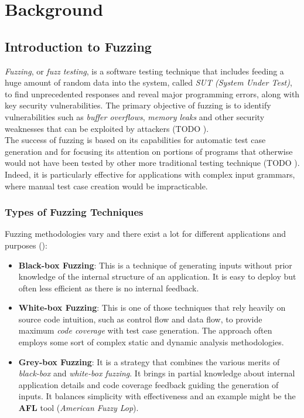 \chapter{Background}

\section{Introduction to Fuzzing}

\textit{Fuzzing}, or \textit{fuzz testing}, is a software testing technique that includes feeding a huge amount of random data into the system, called \textit{SUT (System Under Test)}, to find unprecedented responses and reveal major programming errors, along with key security vulnerabilities. The primary objective of fuzzing is to identify vulnerabilities such as \textit{buffer overflows}, \textit{memory leaks} and other security weaknesses that can be exploited by attackers (TODO \cite{}).
\\The success of fuzzing is based on its capabilities for automatic test case generation and for focusing its attention on portions of programs that otherwise would not have been tested by other more traditional testing technique (TODO \cite{}).
\\Indeed, it is particularly effective for applications with complex input grammars, where manual test case creation would be impracticable.

\subsection{Types of Fuzzing Techniques}
Fuzzing methodologies vary and there exist a lot for different applications and purposes (\cite{statefulfuzzing}):

\begin{itemize}
    \item \textbf{Black-box Fuzzing}: This is a technique of generating inputs without prior knowledge of the internal structure of an application. It is easy to deploy but often less efficient as there is no internal feedback.
    
    \item \textbf{White-box Fuzzing}: This is one of those techniques that rely heavily on source code intuition, such as control flow and data flow, to provide maximum \textit{code coverage} with test case generation. The approach often employs some sort of complex static and dynamic analysis methodologies.
    
    \item \textbf{Grey-box Fuzzing}: It is a strategy that combines the various merits of \textit{black-box} and \textit{white-box fuzzing}. It brings in partial knowledge about internal application details and code coverage feedback guiding the generation of inputs. It balances simplicity with effectiveness and an example might be the \textbf{AFL} tool (\textit{American Fuzzy Lop}).
\end{itemize}

